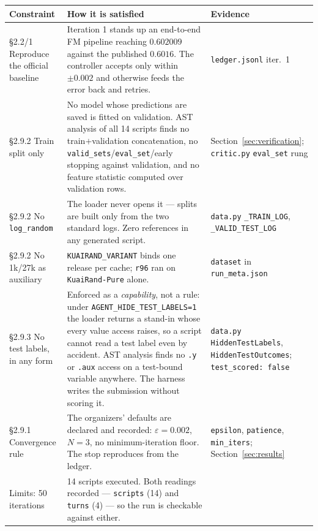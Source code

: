 \documentclass[11pt,a4paper]{article}
\newcommand{\code}[1]{\texttt{#1}}
\newcommand{\file}[1]{\texttt{#1}}
\begin{document}
\begin{table}[htbp]
\centering
\footnotesize
\begin{tabular}{@{}p{3.4cm}p{7.3cm}p{4.2cm}@{}}
\toprule
\textbf{Constraint} & \textbf{How it is satisfied} & \textbf{Evidence} \\
\midrule
\S2.2/1 Reproduce the official baseline
 & Iteration 1 stands up an end-to-end FM pipeline reaching $0.602009$ against the published
   $0.6016$. The controller accepts only within $\pm 0.002$ and otherwise feeds the error back
   and retries.
 & \file{ledger.jsonl} iter.\ 1 \\
\addlinespace
\S2.9.2 Train split only
 & No model whose predictions are saved is fitted on validation. AST analysis of all 14 scripts
   finds no train$+$validation concatenation, no \code{valid\_sets}/\code{eval\_set}/early
   stopping against validation, and no feature statistic computed over validation rows.
 & Section~\ref{sec:verification}; \file{critic.py} \code{eval\_set} rung \\
\addlinespace
\S2.9.2 No \file{log\_random}
 & The loader never opens it --- splits are built only from the two standard logs. Zero
   references in any generated script.
 & \file{data.py} \code{\_TRAIN\_LOG}, \code{\_VALID\_TEST\_LOG} \\
\addlinespace
\S2.9.2 No 1k/27k as auxiliary
 & \code{KUAIRAND\_VARIANT} binds one release per cache; \texttt{r96} ran on
   \code{KuaiRand-Pure} alone.
 & \code{dataset} in \file{run\_meta.json} \\
\addlinespace
\S2.9.3 No test labels, in any form
 & Enforced as a \emph{capability}, not a rule: under \code{AGENT\_HIDE\_TEST\_LABELS=1} the
   loader returns a stand-in whose every value access raises, so a script cannot read a test
   label even by accident. AST analysis finds no \code{.y} or \code{.aux} access on a
   test-bound variable anywhere. The harness writes the submission without scoring it.
 & \file{data.py} \code{HiddenTestLabels}, \code{HiddenTestOutcomes}; \code{test\_scored: false}
   \\
\addlinespace
\S2.9.1 Convergence rule
 & The organizers' defaults are declared and recorded: $\varepsilon = 0.002$, $N = 3$, no
   minimum-iteration floor. The stop reproduces from the ledger.
 & \code{epsilon}, \code{patience}, \code{min\_iters}; Section~\ref{sec:results} \\
\addlinespace
Limits: 50 iterations
 & 14 scripts executed. Both readings recorded --- \code{scripts} (14) and \code{turns} (4) ---
   so the run is checkable against either.

\end{tabular}
\end{table}
\end{document}
